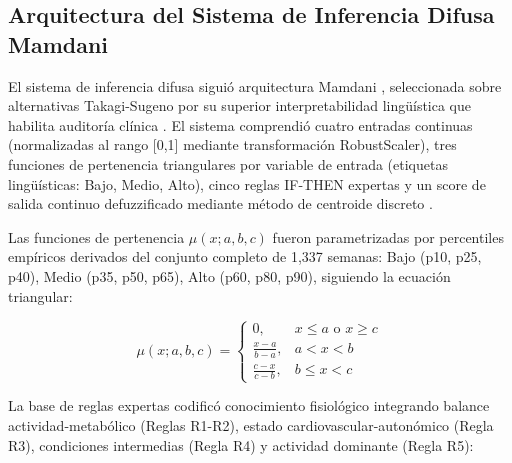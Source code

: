 \documentclass[journal,twoside,web]{ieeecolor}
\begin{document}
\subsection{Arquitectura del Sistema de Inferencia Difusa Mamdani}
\label{subsec:sistema_difuso}

El sistema de inferencia difusa siguió arquitectura Mamdani \cite{Mamdani1974}, seleccionada sobre alternativas Takagi-Sugeno por su superior interpretabilidad lingüística que habilita auditoría clínica \cite{Czmil2023FuzzyClassifiers}. El sistema comprendió cuatro entradas continuas (normalizadas al rango [0,1] mediante transformación RobustScaler), tres funciones de pertenencia triangulares por variable de entrada (etiquetas lingüísticas: Bajo, Medio, Alto), cinco reglas IF-THEN expertas y un score de salida continuo defuzzificado mediante método de centroide discreto \cite{Ross2010}.

Las funciones de pertenencia $\mu(x; a, b, c)$ fueron parametrizadas por percentiles empíricos derivados del conjunto completo de 1,337 semanas: Bajo (p10, p25, p40), Medio (p35, p50, p65), Alto (p60, p80, p90), siguiendo la ecuación triangular:

\begin{equation}
\mu(x; a, b, c) = 
\begin{cases}
0, & x \leq a \text{ o } x \geq c \\
\frac{x-a}{b-a}, & a < x < b \\
\frac{c-x}{c-b}, & b \leq x < c
\end{cases}
\label{eq:pertenencia}
\end{equation}

La base de reglas expertas codificó conocimiento fisiológico integrando balance actividad-metabólico (Reglas R1-R2), estado cardiovascular-autonómico (Regla R3), condiciones intermedias (Regla R4) y actividad dominante (Regla R5):
\end{document}
